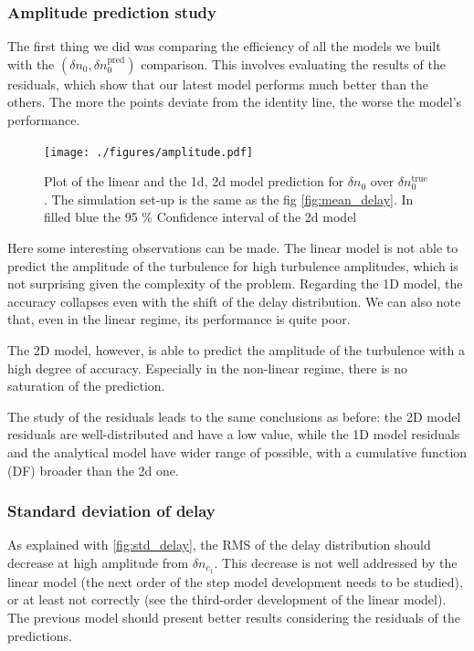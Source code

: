 \documentclass[11pt,a4paper,openany]{report}
\begin{document}
\begin{multicols}{2}
    \subsubsection{Amplitude prediction study}

    The first thing we did was comparing the efficiency of all the models we built with the \((\delta n_0, \delta n_0^{\text{pred}})\) comparison. This involves evaluating the results of the residuals, which show that our latest model performs much better than the others. The more the points deviate from the identity line, the worse the model's performance.

    \begin{figure}[H]
        \centering
        \hspace*{-1.3cm}\texttt{[image: ./figures/amplitude.pdf]}
        \label{}
        \caption{Plot of the linear and the 1d, 2d model prediction for $\delta n_0$ over  $\delta n_0^{\text{true}}$. The simulation set-up is the same as the fig \ref{fig:mean_delay}. In filled blue the 95 \% Confidence interval of the 2d model}
    \end{figure}

    Here some interesting observations can be made. The linear model is not able to predict the amplitude of the turbulence for high turbulence amplitudes, which is not surprising given the complexity of the problem. Regarding the 1D model, the accuracy collapses even with the shift of the delay distribution. We can also note that, even in the linear regime, its performance is quite poor.

    The 2D model, however, is able to predict the amplitude of the turbulence with a high degree of accuracy. Especially in the non-linear regime, there is no saturation of the prediction.

    The study of the residuals leads to the same conclusions as before: the 2D model residuals are well-distributed and have a low value, while the 1D model residuals and the analytical model have wider range of possible, with a cumulative function (DF) broader than the 2d one.
    \subsubsection{Standard deviation of delay}

    As explained with \ref{fig:std_delay}, the RMS of the delay distribution should decrease at high amplitude from \(\delta n_{c_1}\). This decrease is not well addressed by the linear model (the next order of the step model development needs to be studied), or at least not correctly (see the third-order development of the linear model). The previous model should present better results considering the residuals of the predictions.


\end{multicols}
\end{document}
